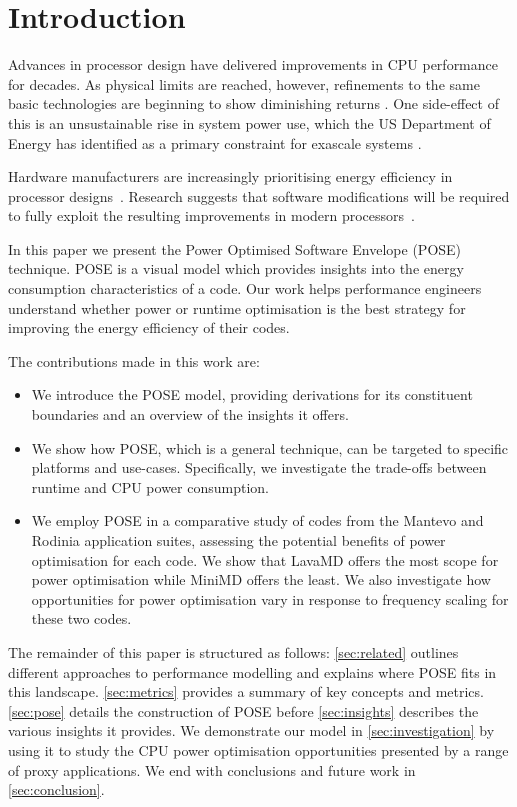 \section{Introduction}
Advances in processor design have delivered improvements in CPU performance for decades. As physical limits are reached, however, refinements to the same basic technologies are beginning to show diminishing returns \cite{esmaeilzadeh:2011aa}. One side-effect of this is an unsustainable rise in system power use, which the US Department of Energy has identified as a primary constraint for exascale systems \cite{shalf:2011aa}.

Hardware manufacturers are increasingly prioritising energy efficiency in processor designs~\cite{kurd:2014aa}. 
Research suggests that software modifications will be required to fully exploit the resulting improvements in modern processors~\cite{shao:2013aa}.

In this paper we present the Power Optimised Software Envelope (POSE) technique.
POSE is a visual model which provides insights into the energy consumption characteristics of a code.
Our work helps performance engineers understand whether power or runtime optimisation is the best strategy for improving the energy efficiency of their codes.

\medskip \noindent
The contributions made in this work are:
\begin{itemize}
  \item We introduce the POSE model, providing derivations for its constituent boundaries and an overview of the insights it offers.
  \item We show how POSE, which is a general technique, can be targeted to specific platforms and use-cases. 
        Specifically, we investigate the trade-offs between runtime and CPU power consumption.
  \item We employ POSE in a comparative study of codes from the Mantevo and Rodinia application suites, assessing the potential benefits of power optimisation for each code.
        We show that LavaMD offers the most scope for power optimisation while MiniMD offers the least.
        We also investigate how opportunities for power optimisation vary in response to frequency scaling for these two codes.
\end{itemize}

The remainder of this paper is structured as follows: \autoref{sec:related} outlines different approaches to performance modelling and explains where POSE fits in this landscape.
\autoref{sec:metrics} provides a summary of key concepts and metrics.
\autoref{sec:pose} details the construction of POSE before \autoref{sec:insights} describes the various insights it provides.
We demonstrate our model in \autoref{sec:investigation} by using it to study the CPU power optimisation opportunities presented by a range of proxy applications. 
We end with conclusions and future work in \autoref{sec:conclusion}.
